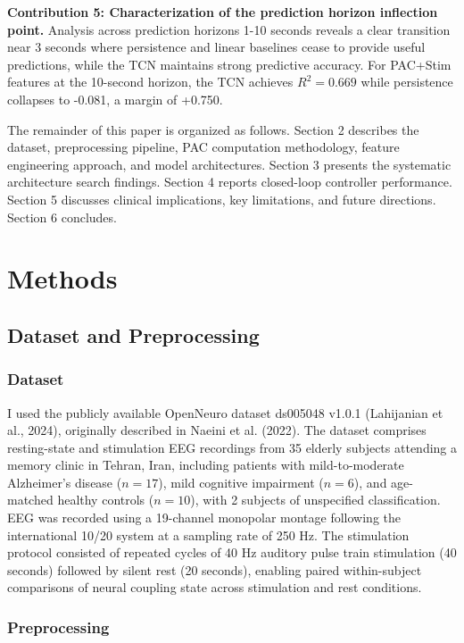 \documentclass[11pt,letterpaper]{article}
\begin{document}
\textbf{Contribution 5: Characterization of the prediction horizon inflection point.} Analysis across prediction horizons 1-10 seconds reveals a clear transition near 3 seconds where persistence and linear baselines cease to provide useful predictions, while the TCN maintains strong predictive accuracy. For PAC+Stim features at the 10-second horizon, the TCN achieves $R^2 = 0.669$ while persistence collapses to -0.081, a margin of +0.750.

The remainder of this paper is organized as follows. Section 2 describes the dataset, preprocessing pipeline, PAC computation methodology, feature engineering approach, and model architectures. Section 3 presents the systematic architecture search findings. Section 4 reports closed-loop controller performance. Section 5 discusses clinical implications, key limitations, and future directions. Section 6 concludes.

\section{Methods}

\subsection{Dataset and Preprocessing}

\subsubsection{Dataset}

I used the publicly available OpenNeuro dataset ds005048 v1.0.1 (Lahijanian et al., 2024), originally described in Naeini et al. (2022). The dataset comprises resting-state and stimulation EEG recordings from 35 elderly subjects attending a memory clinic in Tehran, Iran, including patients with mild-to-moderate Alzheimer's disease ($n = 17$), mild cognitive impairment ($n = 6$), and age-matched healthy controls ($n = 10$), with 2 subjects of unspecified classification. EEG was recorded using a 19-channel monopolar montage following the international 10/20 system at a sampling rate of 250 Hz. The stimulation protocol consisted of repeated cycles of 40 Hz auditory pulse train stimulation (40 seconds) followed by silent rest (20 seconds), enabling paired within-subject comparisons of neural coupling state across stimulation and rest conditions.

\subsubsection{Preprocessing}
\end{document}
